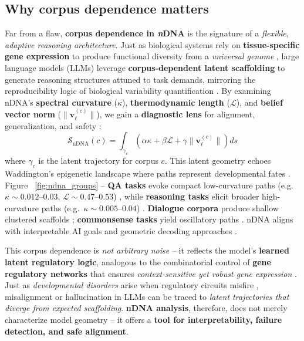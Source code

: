 \subsection*{Why corpus dependence matters}
Far from a flaw, \textbf{corpus dependence in \emph{n}DNA} is the signature of a \emph{flexible}, \emph{adaptive reasoning architecture}. 
Just as biological systems rely on \textbf{tissue-specific gene expression} to produce functional diversity from a \emph{universal genome} \citep{davidson2006gene, alon2006introduction}, large language models (LLMs) leverage \textbf{corpus-dependent latent scaffolding} to generate reasoning structures attuned to task demands, mirroring the reproducibility logic of biological variability quantification \citep{marioni2011rna}. 
By examining nDNA’s \textbf{spectral curvature} ($\kappa$), \textbf{thermodynamic length} ($\mathcal{L}$), and \textbf{belief vector norm} ($\|\mathbf{v}_\ell^{(c)}\|$), we gain a \textbf{diagnostic lens} for alignment, generalization, and safety \citep{belkin2019reconciling, still2012thermodynamic, olah2020zoom}:
\[
\mathcal{S}_{\mathrm{nDNA}}(c) = \int_{\gamma_c} \left( \alpha \kappa + \beta \mathcal{L} + \gamma \|\mathbf{v}_\ell^{(c)}\| \right) ds
\]
where $\gamma_c$ is the latent trajectory for corpus $c$. This latent geometry echoes Waddington’s epigenetic landscape where paths represent developmental fates \citep{waddington1957strategy}. 
Figure ~\ref{fig:ndna_groups} -- \textbf{QA tasks} evoke compact low-curvature paths (e.g.\ $\kappa \sim 0.012$--$0.03$, $\mathcal{L} \sim 0.47$--$0.53$) \citep{rajpurkar2016squad, kwiatkowski2019natural, joshi2017triviaqa}, while \textbf{reasoning tasks} elicit broader high-curvature paths (e.g.\ $\kappa \sim 0.005$--$0.04$) \citep{cobbe2021training, patel2021nlp, geva2021transformer}. 
\textbf{Dialogue corpora} produce shallow clustered scaffolds \citep{budzianowski2018multiwoz, li2016persona, zhang2018personalizing}; \textbf{commonsense tasks} yield oscillatory paths \citep{sap2019socialiqa, zellers2019hellaswag, talmor2019commonsenseqa}. 
nDNA aligns with interpretable AI goals \citep{zhang2018interpretable} and geometric decoding approaches \citep{narayanan2021decoding}.


This corpus dependence is \emph{not arbitrary noise} -- it reflects the model’s \textbf{learned latent regulatory logic}, analogous to the combinatorial control of \textbf{gene regulatory networks} that ensures \emph{context-sensitive yet robust gene expression} \citep{alon2006introduction, lewin2013genes}. 
Just as \emph{developmental disorders} arise when regulatory circuits misfire \citep{davidson2006gene}, misalignment or hallucination in LLMs can be traced to \emph{latent trajectories that diverge from expected scaffolding}. 
\textbf{nDNA analysis}, therefore, does not merely characterize model geometry -- it offers a \textbf{tool for interpretability, failure detection, and safe alignment}.


